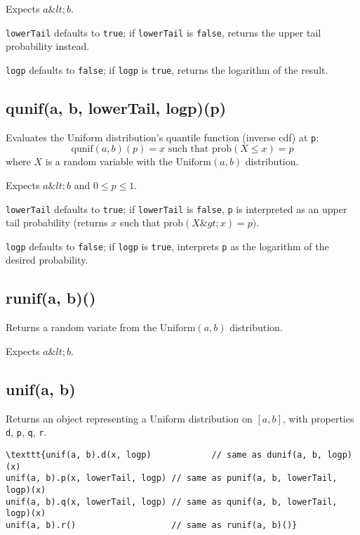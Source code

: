 \documentclass{article}
\begin{document}
Expects $a \&lt; b$.


\texttt{lowerTail} defaults to \texttt{true}; if \texttt{lowerTail} is \texttt{false}, returns
the upper tail probability instead.


\texttt{logp} defaults to \texttt{false}; if \texttt{logp} is \texttt{true}, returns the logarithm
of the result.


    \subsection*{qunif(a, b, lowerTail, logp)(p)}
    Evaluates the Uniform distribution's quantile function
(inverse cdf) at \texttt{p}:
$$\textrm{qunif}(a, b)(p) = x \textrm{ such that } \textrm{prob}(X \leq x) = p$$
where $X$ is a random variable with the $\textrm{Uniform}(a, b)$ distribution.


Expects $a \&lt; b$ and $0 \leq p \leq 1$.


\texttt{lowerTail} defaults to \texttt{true}; if \texttt{lowerTail} is \texttt{false}, \texttt{p} is
interpreted as an upper tail probability (returns
$x$ such that $\textrm{prob}(X \&gt; x) = p)$.


\texttt{logp} defaults to \texttt{false}; if \texttt{logp} is \texttt{true}, interprets \texttt{p} as
the logarithm of the desired probability.


    \subsection*{runif(a, b)()}
    Returns a random variate from the $\textrm{Uniform}(a,b)$ distribution.


Expects $a\&lt;b$.


    \subsection*{unif(a, b)}
    Returns an object representing a Uniform distribution on $[a, b]$,
with properties \texttt{d}, \texttt{p}, \texttt{q}, \texttt{r}.


\begin{lstlisting}
\texttt{unif(a, b).d(x, logp)            // same as dunif(a, b, logp)(x)
unif(a, b).p(x, lowerTail, logp) // same as punif(a, b, lowerTail, logp)(x)
unif(a, b).q(x, lowerTail, logp) // same as qunif(a, b, lowerTail, logp)(x)
unif(a, b).r()                   // same as runif(a, b)()}\end{lstlisting}
\end{document}
